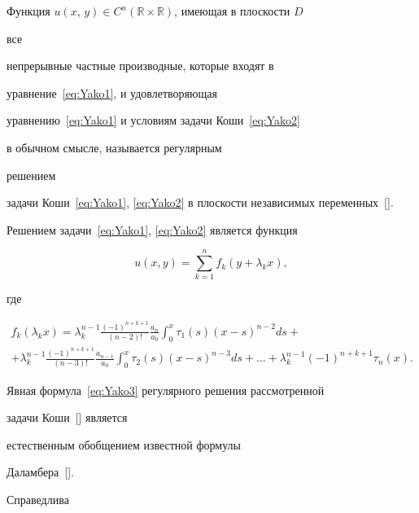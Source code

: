 \smallskip



Функция $u\left(x,\,y\right)\in

C^{n}(\mathbb{R}\times\mathbb{R})$, имеющая в плоскости $D$

все

непрерывные частные производные, которые входят в

уравнение~\eqref{eq:Yako1}, и удовлетворяющая

уравнению~\eqref{eq:Yako1} и условиям задачи Коши~\eqref{eq:Yako2}

в обычном смысле, называется регулярным

решением 

задачи Коши~\eqref{eq:Yako1}, \eqref{eq:Yako2} в плоскости независимых переменных~[].



Решением задачи~\eqref{eq:Yako1}, \eqref{eq:Yako2} является функция

\begin{equation}

u(x,y)=\sum\limits_{k=1}^{n}f_{k}(y+\lambda_{k}x),\label{eq:Yako3}

\end{equation}

где

\begin{multline}

f_{k}(\lambda_{k}x)=\lambda_{k}^{n-1}\frac{(-1)^{n+k+1}}{(n-2)!}\frac{a_{n}}{a_{0}}\int

_{0}^{x}\tau_{1}(s)(x-s)^{n-2}ds+ 

\\

+\lambda_{k}^{n-1}\frac{(-1)^{n+k+1}}{(n-3)!}\frac{a_{n-1}}{a_{0}}\int _{0}^{x}\tau_{2}(s)(x-s)^{n-3}ds+\dots+\lambda_{k}^{n-1}(-1)^{n+k+1}\tau_{n}(x).

\label{eq:Yako4}

\end{multline}



Явная формула~\eqref{eq:Yako3} регулярного решения рассмотренной

задачи Коши~[] является

естественным обобщением известной формулы

Даламбера~[].



Справедлива 



